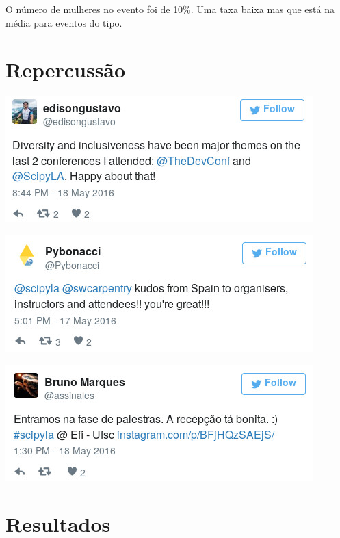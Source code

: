 \documentclass[12pt]{article}
\begin{document}
O número de mulheres no evento foi de 10\%. Uma taxa baixa mas que está na média
para eventos do tipo.

\newpage

\section*{Repercussão}

\noindent  %
\includegraphics[width=\textwidth]{tweet-diversidade.jpg}

\noindent  %
\includegraphics[width=\textwidth]{tweet-kudos.jpg}

\noindent  %
\includegraphics[width=\textwidth]{tweet-recepcao.jpg}

\newpage

\section*{Resultados}
\end{document}
